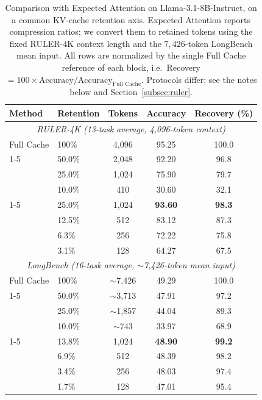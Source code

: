\documentclass{article} %
\newcommand{\best}[1]{\textcolor{bestblue}{\textbf{#1}}}
\newcommand{\second}[1]{\textcolor{secondorange}{#1}}
\newcommand{\lorekvE}{LORE-KV\,/E}
\newcommand{\lorekvD}{LORE-KV\,/D}
\begin{document}
\begin{table}[t]
\color{purple}
\caption{Comparison with Expected Attention \citep{devoto2025expected} on
Llama-3.1-8B-Instruct, on a common KV-cache retention axis. Expected Attention
reports compression ratios; we convert them to retained tokens using the fixed
RULER-4K context length and the $7{,}426$-token LongBench mean input. All rows are
normalized by the single Full Cache reference of each block, i.e.\ Recovery
$=100\times\text{Accuracy}/\text{Accuracy}_{\text{Full Cache}}$. Protocols differ;
see the notes below and Section~\ref{subsec:ruler}.}
\label{tab:expected_attention_comparison}
\centering
\small
\setlength{\tabcolsep}{5pt}
\begin{tabular}{@{}llccc@{}}
\toprule
Method & Retention & Tokens & Accuracy & Recovery (\%) \\
\midrule
\multicolumn{5}{c}{\textit{RULER-4K (13-task average, 4,096-token context)}} \\
\midrule
Full Cache & 100\% & 4,096 & 95.25 & 100.0 \\
\cmidrule(lr){1-5}
\multirow{3}{*}{Expected Attention}
   & 50.0\% & 2,048 & 92.20 & 96.8 \\
   & 25.0\% & 1,024 & 75.90 & 79.7 \\
   & 10.0\% & \phantom{0,}410 & 30.60 & 32.1 \\
\cmidrule(lr){1-5}
\multirow{4}{*}{\textbf{\lorekvE\ (ours)}}
   & 25.0\% & 1,024 & \best{93.60} & \best{98.3} \\
   & 12.5\% & \phantom{0,}512 & \second{83.12} & \second{87.3} \\
   & \phantom{0}6.3\% & \phantom{0,}256 & 72.22 & 75.8 \\
   & \phantom{0}3.1\% & \phantom{0,}128 & 64.27 & 67.5 \\
\midrule
\multicolumn{5}{c}{\textit{LongBench (16-task average, $\sim$7,426-token mean input)}} \\
\midrule
Full Cache & 100\% & $\sim$7,426 & 49.29 & 100.0 \\
\cmidrule(lr){1-5}
\multirow{3}{*}{Expected Attention}
   & 50.0\% & $\sim$3,713 & 47.91 & 97.2 \\
   & 25.0\% & $\sim$1,857 & 44.04 & 89.3 \\
   & 10.0\% & \phantom{$\sim$0,}$\sim$743 & 33.97 & 68.9 \\
\cmidrule(lr){1-5}
\multirow{4}{*}{\textbf{\lorekvD\ (ours)}}
   & 13.8\% & \phantom{$\sim$}1,024 & \best{48.90} & \best{99.2} \\
   & \phantom{0}6.9\% & \phantom{$\sim$0,}512 & \second{48.39} & \second{98.2} \\
   & \phantom{0}3.4\% & \phantom{$\sim$0,}256 & 48.03 & 97.4 \\
   & \phantom{0}1.7\% & \phantom{$\sim$0,}128 & 47.01 & 95.4 \\
\bottomrule
\end{tabular}
\end{table}
\end{document}
